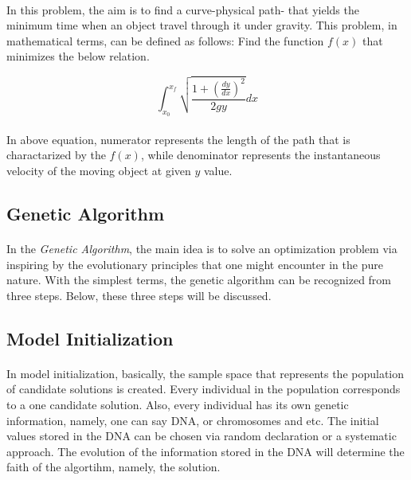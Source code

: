 \documentclass[letterpaper,12pt]{article}
\begin{document}
\paragraph{} In this problem, the aim is to find a curve-physical path- that yields the minimum time when an object travel through it under gravity. This problem, in mathematical terms, can be defined as follows: Find the function $f(x)$ that minimizes the below relation.

\begin{equation}
    \int_{x_0}^{x_f} \sqrt{\frac{1 + \left(\frac{dy}{dx}\right)^2}{2gy}}dx
    \label{eq:brach}
\end{equation}
\paragraph{}In above equation, numerator represents the length of the path that is charactarized by the $f(x)$, while denominator represents the instantaneous velocity of the moving object at given $y$ value.

\subsection{Genetic Algorithm}
\paragraph{}In the \textit{Genetic Algorithm}, the main idea is to solve an optimization problem via inspiring by the evolutionary principles that one might encounter in the pure nature. With the simplest terms, the genetic algorithm can be recognized from three steps. Below, these three steps will be discussed.

\subsection{Model Initialization}
\paragraph{} In model initialization, basically, the sample space that represents the population of candidate solutions is created. Every individual in the population corresponds to a one candidate solution. Also, every individual has its own genetic information, namely, one can say DNA, or chromosomes and etc. The initial values stored in the DNA can be chosen via random declaration or a systematic approach. The evolution of the information stored in the DNA will determine the faith of the algortihm, namely, the solution.
\end{document}
